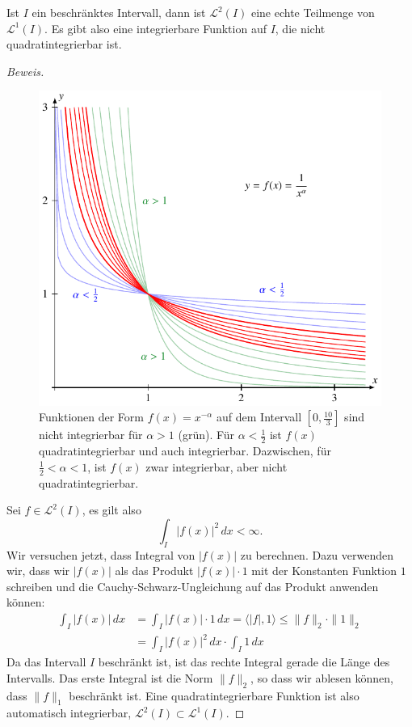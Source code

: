 \begin{lemma}
\label{fourier:l1l2}
Ist $I$ ein beschränktes Intervall, dann ist $\mathcal{L}^2(I)$ eine
echte Teilmenge von $\mathcal{L}^1(I)$.
Es gibt also eine integrierbare Funktion auf $I$, die nicht
quadratintegrierbar ist.
\end{lemma}

\begin{proof}[Beweis]
\begin{figure}
\centering
\includegraphics{chapters/2-fourier/images/intfun.pdf}
\caption{Funktionen der Form $f(x)=x^{-\alpha}$ auf dem Intervall
$[0,\frac{10}{3}]$ sind nicht integrierbar für $\alpha > 1$ (grün).
Für $\alpha <\frac12$ ist $f(x)$ quadratintegrierbar und auch integrierbar.
Dazwischen, für $\frac12 <\alpha < 1$, ist $f(x)$ zwar integrierbar, aber
nicht quadratintegrierbar.
\label{fourier:intfun}}
\end{figure}
Sei $f\in\mathcal{L}^2(I)$, es gilt also
\[
\int_I |f(x)|^2\,dx < \infty.
\]
Wir versuchen jetzt, dass Integral von $|f(x)|$ zu berechnen.
Dazu verwenden wir, dass wir $|f(x)|$ als das Produkt
$|f(x)|\cdot 1$ mit der Konstanten Funktion $1$ schreiben
und die Cauchy-Schwarz-Ungleichung auf das Produkt anwenden können:
\begin{align*}
\int_I |f(x)|\,dx
&=
\int_I |f(x)| \cdot 1 \,dx
=
\langle |f|, 1\rangle
\le
\|f\|_2 \cdot \| 1 \|_2
\\
&=
\int_I |f(x)|^2\,dx \cdot \int_I 1\,dx
\end{align*}
Da das Intervall $I$ beschränkt ist, ist das rechte Integral gerade die
Länge des Intervalls.
Das erste Integral ist die Norm $\|f\|_2$, so dass wir ablesen können,
dass $\|f\|_1$ beschränkt ist.
Eine quadratintegrierbare Funktion ist also automatisch integrierbar,
$\mathcal{L}^2(I)\subset \mathcal{L}^1(I)$.


\end{proof}
